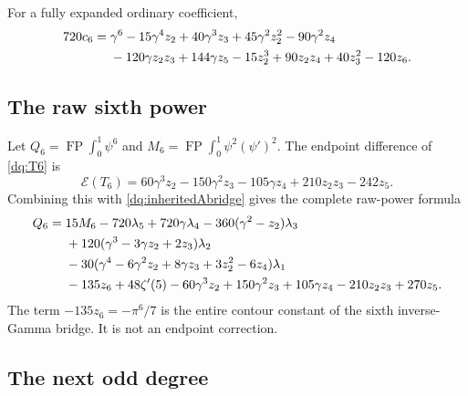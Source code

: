\documentclass[11pt,a4paper]{article}
\numberwithin{equation}{section}
\theoremstyle{plain}
\theoremstyle{definition}
\theoremstyle{remark}
\begin{document}
For a fully expanded ordinary coefficient,
\begin{align}
 720c_6={}&\gamma^6-15\gamma^4z_2+40\gamma^3z_3
       +45\gamma^2z_2^2-90\gamma^2z_4\notag\\
 &-120\gamma z_2z_3+144\gamma z_5
       -15z_2^3+90z_2z_4+40z_3^2-120z_6.
 \label{dq:c6}
\end{align}

\subsection{The raw sixth power}

Let $Q_6=\operatorname{FP}\int_0^1\psi^6$ and
$M_6=\operatorname{FP}\int_0^1\psi^2(\psi')^2$.
The endpoint difference of \eqref{dq:T6} is
\begin{equation}\label{dq:rawsixthendpoint}
 \mathcal E(T_6)=60\gamma^3z_2-150\gamma^2z_3-105\gamma z_4
                              +210z_2z_3-242z_5.
\end{equation}
Combining this with \eqref{dq:inheritedAbridge} gives the complete
raw-power formula
\begin{align}
 Q_6={}&15M_6-720\lambda_5+720\gamma\lambda_4
          -360(\gamma^2-z_2)\lambda_3\notag\\
 &+120(\gamma^3-3\gamma z_2+2z_3)\lambda_2\notag\\
 &-30(\gamma^4-6\gamma^2z_2+8\gamma z_3
                       +3z_2^2-6z_4)\lambda_1\notag\\
 &-135z_6+48\zeta'(5)-60\gamma^3z_2+150\gamma^2z_3
             +105\gamma z_4-210z_2z_3+270z_5.
 \label{dq:rawsixth}
\end{align}
The term $-135z_6=-\pi^6/7$ is the entire contour constant of
the sixth inverse-Gamma bridge. It is not an endpoint correction.

\subsection{The next odd degree}
\end{document}
